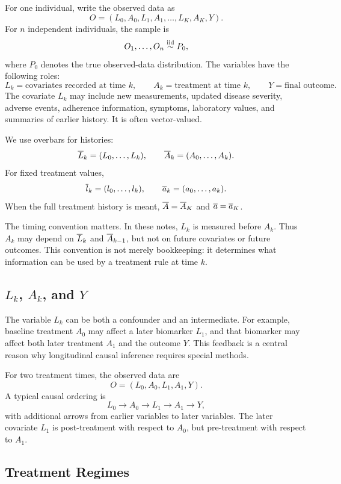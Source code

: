 For one individual, write the observed data as
\[
  O=(L_0,A_0,L_1,A_1,\ldots,L_K,A_K,Y).
\]
For $n$ independent individuals, the sample is
\[
  O_1,\ldots,O_n \overset{\mathrm{iid}}{\sim} P_0,
\]
where $P_0$ denotes the true observed-data distribution. The variables have the
following roles:
\[
  L_k = \text{covariates recorded at time } k,\qquad
  A_k = \text{treatment at time } k,\qquad
  Y = \text{final outcome}.
\]
The covariate $L_k$ may include new measurements, updated disease severity,
adverse events, adherence information, symptoms, laboratory values, and summaries
of earlier history. It is often vector-valued.

\begin{notation}
We use overbars for histories:
\[
  \overline{L}_k=(L_0,\ldots,L_k),\qquad
  \overline{A}_k=(A_0,\ldots,A_k).
\]
For fixed treatment values,
\[
  \overline{l}_k=(l_0,\ldots,l_k),\qquad
  \overline{a}_k=(a_0,\ldots,a_k).
\]
When the full treatment history is meant, $\overline{A}=\overline{A}_K$ and
$\overline{a}=\overline{a}_K$.
\end{notation}

The timing convention matters. In these notes, $L_k$ is measured before $A_k$.
Thus $A_k$ may depend on $\overline{L}_k$ and $\overline{A}_{k-1}$, but not on future
covariates or future outcomes. This convention is not merely bookkeeping: it
determines what information can be used by a treatment rule at time $k$.

\subsection{$L_k$, $A_k$, and $Y$}

The variable $L_k$ can be both a confounder and an intermediate. For example,
baseline treatment $A_0$ may affect a later biomarker $L_1$, and that biomarker
may affect both later treatment $A_1$ and the outcome $Y$. This feedback is a
central reason why longitudinal causal inference requires special methods.

For two treatment times, the observed data are
\[
  O=(L_0,A_0,L_1,A_1,Y).
\]
A typical causal ordering is
\[
  L_0 \rightarrow A_0 \rightarrow L_1 \rightarrow A_1 \rightarrow Y,
\]
with additional arrows from earlier variables to later variables. The later
covariate $L_1$ is post-treatment with respect to $A_0$, but pre-treatment with
respect to $A_1$.

\subsection{Treatment Regimes}

